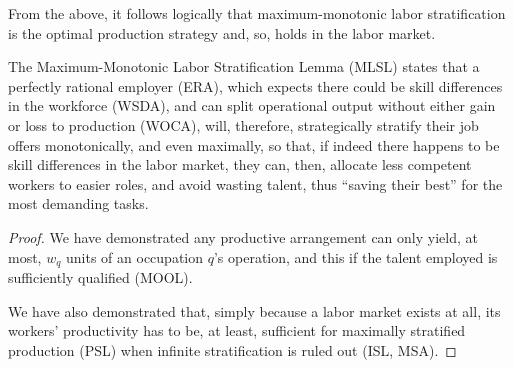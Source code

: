 \documentclass[hidelinks, nonatbib]{elsarticle}
\begin{document}
From the above, it follows logically that maximum-monotonic labor stratification is the optimal production strategy and, so, holds in the labor market.
\begin{lemma}
    \label{mlsl}
    The Maximum-Monotonic Labor Stratification Lemma (MLSL) states that a perfectly rational employer (ERA), which expects there could be skill differences in the workforce (WSDA), and can split operational output without either gain or loss to production (WOCA), will, therefore, strategically stratify their job offers monotonically, and even maximally, so that, if indeed there happens to be skill differences in the labor market, they can, then, allocate less competent workers to easier roles, and avoid wasting talent, thus ``saving their best'' for the most demanding tasks.

    \begin{proof}
        We have demonstrated any productive arrangement can only yield, at most, $w_q$ units of an occupation $q$'s operation, and this if the talent employed is sufficiently qualified (MOOL).

        We have also demonstrated that, simply because a labor market exists at all, its workers' productivity has to be, at least, sufficient for maximally stratified production (PSL) when infinite stratification is ruled out (ISL, MSA).


\end{proof}
\end{lemma}
\end{document}

